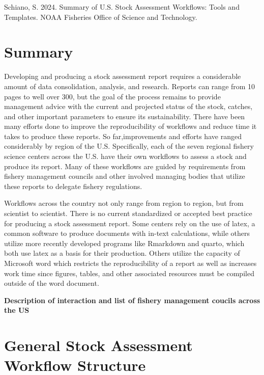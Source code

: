 \documentclass[
  letterpaper,
  oneside,
  open=any]{scrbook}
\begin{document}

Schiano, S. 2024. Summary of U.S. Stock Assessment Workflows: Tools and
Templates. NOAA Fisheries Office of Science and Technology.


\chapter{Summary}\label{summary}

Developing and producing a stock assessment report requires a
considerable amount of data consolidation, analysis, and research.
Reports can range from 10 pages to well over 300, but the goal of the
process remains to provide management advice with the current and
projected status of the stock, catches, and other important parameters
to ensure its sustainability. There have been many efforts done to
improve the reproducibility of workflows and reduce time it takes to
produce these reports. So far,improvements and efforts have ranged
considerably by region of the U.S. Specifically, each of the seven
regional fishery science centers across the U.S. have their own
workflows to assess a stock and produce its report. Many of these
workflows are guided by requirements from fishery management councils
and other involved managing bodies that utilize these reports to
delegate fishery regulations.

Workflows across the country not only range from region to region, but
from scientist to scientist. There is no current standardized or
accepted best practice for producing a stock assessment report. Some
centers rely on the use of latex, a common software to produce documents
with in-text calculations, while others utilize more recently developed
programs like Rmarkdown and quarto, which both use latex as a basis for
their production. Others utilize the capacity of Microsoft word which
restricts the reproducibility of a report as well as increases work time
since figures, tables, and other associated resources must be compiled
outside of the word document.

\textbf{Description of interaction and list of fishery management
coucils across the US}


\chapter{General Stock Assessment Workflow
Structure}\label{general-stock-assessment-workflow-structure}
\end{document}
